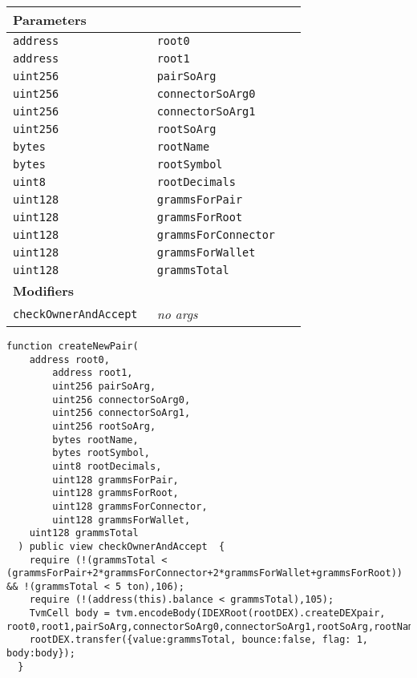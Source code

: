 \ifsoltables
\noindent\begin{tabular}{|l|l|p{5cm}|}\hline
\multicolumn{3}{|l|}{\bf Parameters}\\\hline
\tt address & \tt root0 &\\\hline
\tt address & \tt root1 &\\\hline
\tt uint256 & \tt pairSoArg &\\\hline
\tt uint256 & \tt connectorSoArg0 &\\\hline
\tt uint256 & \tt connectorSoArg1 &\\\hline
\tt uint256 & \tt rootSoArg &\\\hline
\tt bytes & \tt rootName &\\\hline
\tt bytes & \tt rootSymbol &\\\hline
\tt uint8 & \tt rootDecimals &\\\hline
\tt uint128 & \tt grammsForPair &\\\hline
\tt uint128 & \tt grammsForRoot &\\\hline
\tt uint128 & \tt grammsForConnector &\\\hline
\tt uint128 & \tt grammsForWallet &\\\hline
\tt uint128 & \tt grammsTotal &\\\hline
\multicolumn{3}{|l|}{\bf Modifiers}\\\hline
\tt checkOwnerAndAccept & {\em no args} &\\\hline
\end{tabular}
\fi



\begin{lstlisting}[firstnumber=356]
  function createNewPair(
    address root0,
		address root1,
		uint256 pairSoArg,
		uint256 connectorSoArg0,
		uint256 connectorSoArg1,
		uint256 rootSoArg,
		bytes rootName,
		bytes rootSymbol,
		uint8 rootDecimals,
		uint128 grammsForPair,
		uint128 grammsForRoot,
		uint128 grammsForConnector,
		uint128 grammsForWallet,
    uint128 grammsTotal
  ) public view checkOwnerAndAccept  {
    require (!(grammsTotal < (grammsForPair+2*grammsForConnector+2*grammsForWallet+grammsForRoot)) && !(grammsTotal < 5 ton),106);
    require (!(address(this).balance < grammsTotal),105);
    TvmCell body = tvm.encodeBody(IDEXRoot(rootDEX).createDEXpair, root0,root1,pairSoArg,connectorSoArg0,connectorSoArg1,rootSoArg,rootName,rootSymbol,rootDecimals,grammsForPair,grammsForRoot,grammsForConnector,grammsForWallet);
    rootDEX.transfer({value:grammsTotal, bounce:false, flag: 1, body:body});
  }
\end{lstlisting}

